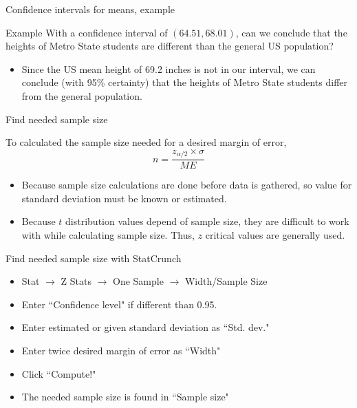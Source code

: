 \documentclass[xcolor=table]{beamer}
\begin{document}
\begin{frame}{Confidence intervals for means, example}
\begin{exampleblock}{Example}
With a confidence interval of $(64.51, 68.01)$, can we conclude that the heights of Metro State students are different than the general US population?
\begin{itemize}
\pause\item Since the US mean height of 69.2 inches is not in our interval, we can conclude (with 95\% certainty) that the heights of Metro State students differ from the general population.
\end{itemize}
\end{exampleblock}
\end{frame}


\begin{frame}{Find needed sample size}
\begin{block}{}
\large
To calculated the sample size needed for a desired margin of error,
\[n = \frac{z_{\alpha/2} \times \sigma}{ME}\]
\begin{itemize}
\pause\item Because sample size calculations are done before data is gathered, so value for standard deviation must be known or estimated.
\pause\item Because $t$ distribution values depend of sample size, they are difficult to work with while calculating sample size. Thus, $z$ critical values are generally used.
\end{itemize}
\end{block}
\end{frame}

\begin{frame}{Find needed sample size with StatCrunch}
\begin{block}{}
\begin{itemize}
\item Stat $\to$ Z Stats $\to$ One Sample $\to$ Width/Sample Size
\item Enter ``Confidence level" if different than 0.95.
\item Enter estimated or given standard deviation as ``Std. dev."
\item Enter twice desired margin of error as ``Width" 
\item Click ``Compute!"
\item The needed sample size is found in ``Sample size"
\end{itemize}
\end{block}

\end{frame}
\end{document}
